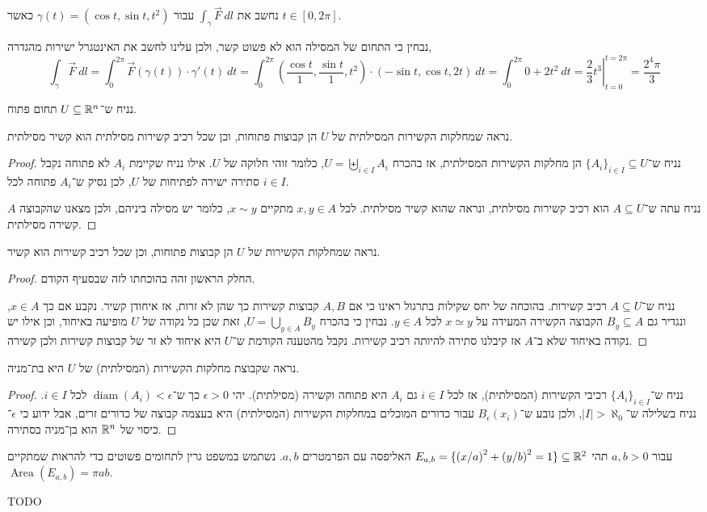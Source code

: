 \subquestion{}
נחשב את $\int_{\gamma} \vec{F}\ dl$ עבור $\gamma(t) = (\cos t, \sin t, t^2)$ כאשר $t \in [0, 2 \pi]$.
\begin{solution}
	נבחין כי התחום של המסילה הוא לא פשוט קשר, ולכן עלינו לחשב את האינטגרל ישירות מהגדרה,
	\[
		\int_{\gamma} \vec{F}\ dl
		= \int_{0}^{2 \pi} \vec{F}(\gamma(t)) \cdot \gamma'(t)\ dt
		= \int_{0}^{2 \pi} (\frac{\cos t}{1}, \frac{\sin t}{1}, t^2) \cdot (-\sin t, \cos t, 2t)\ dt
		= \int_{0}^{2 \pi} 0 + 2t^2\ dt
		= {\left. \frac{2}{3} t^3 \right|}_{t = 0}^{t = 2 \pi}
		= \frac{2^4 \pi}{3}
	\]
\end{solution}

\question{}
נניח ש־$U \subseteq \mathbb{R}^n$ תחום פתוח.

\subquestion[2]
נראה שמחלקות הקשירות המסילתית של $U$ הן קבוצות פתוחות, וכן שכל רכיב קשירות מסילתית הוא קשיר מסילתית.
\begin{proof}
	נניח ש־${\{ A_i \}}_{i \in I} \subseteq U$ הן מחלקות הקשירות המסילתית, אז בהכרח $U = \biguplus_{i \in I} A_i$, כלומר זוהי חלוקה של $U$.
	אילו נניח שקיימת $A_i$ לא פתוחה נקבל סתירה ישירה לפתיחות של $U$, לכן נסיק ש־$A_i$ פתוחה לכל $i \in I$.

	נניח עתה ש־$A \subseteq U$ הוא רכיב קשירות מסילתית, ונראה שהוא קשיר מסילתית.
	לכל $x, y \in A$ מתקיים $x \sim y$, כלומר יש מסילה ביניהם, ולכן מצאנו שהקבוצה $A$ קשירה מסילתית.
\end{proof}

\subquestion{}
נראה שמחלקות הקשירות של $U$ הן קבוצות פתוחות, וכן שכל רכיב קשירות הוא קשיר.
\begin{proof}
	החלק הראשון זהה בהוכחתו לזה שבסעיף הקודם.

	נניח ש־$A \subseteq U$ רכיב קשירות.
	בהוכחה של יחס שקילות בתרגול ראינו כי אם $A, B$ קבוצות קשירות כך שהן לא זרות, אז איחודן קשיר.
	נקבע אם כך $x \in A$, ונגדיר גם $B_y \subseteq A$ הקבוצה הקשירה המעידה על $x \simeq y$ לכל $y \in A$.
	נבחין כי בהכרח $U = \bigcup_{y \in A} B_y$, זאת שכן כל נקודה של $U$ מופיעה באיחוד, וכן אילו יש נקודה באיחוד שלא ב־$A$ אז קיבלנו סתירה להיותה רכיב קשירות.
	נקבל מהטענה הקודמת ש־$U$ היא איחוד לא זר של קבוצות קשירות ולכן קשירה.
\end{proof}

\subquestion{}
נראה שקבוצת מחלקות הקשירות (המסילתית) של $U$ היא בת־מניה.
\begin{proof}
	נניח ש־${\{ A_i \}}_{i \in I}$ רכיבי הקשירות (המסילתית), אז לכל $i \in I$ גם $A_i$ היא פתוחה וקשירה (מסילתית).
	יהי $\epsilon > 0$ כך ש־$\operatorname{diam}(A_i) < \epsilon$ לכל $i \in I$.
	נניח בשלילה ש־$|I| > \aleph_0$, ולכן נובע ש־$B_{\epsilon}(x_i)$ עבור כדורים המוכלים במחלקות הקשירות (המסילתית) היא בעצמה קבוצה של כדורים זרים, אבל ידוע כי $\epsilon$־כיסוי של $\mathbb{R}^n$ הוא בן־מניה בסתירה.
\end{proof}

\question{}
עבור $a, b > 0$ תהי $E_{a, b} = \{ {(x / a)}^2 + {(y / b)}^2 = 1 \} \subseteq \mathbb{R}^2$ האליפסה עם הפרמטרים $a, b$.
נשתמש במשפט גרין לתחומים פשוטים כדי להראות שמתקיים $\operatorname{Area}(E_{a, b}) = \pi a b$.
\begin{solution}
	TODO
\end{solution}


